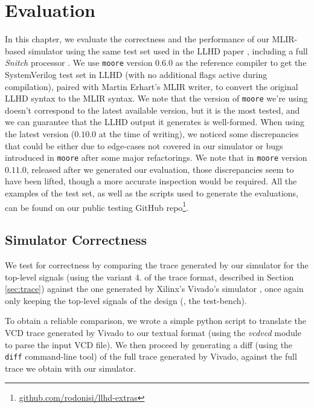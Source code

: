 \chapter{Evaluation}
\label{ch:eval}

In this chapter, we evaluate the correctness and the performance of our MLIR-based simulator using the same test set used in the LLHD paper \cite{Schuiki2020}, including a full \textit{Snitch} processor \cite{Zaruba2020}. We use \texttt{moore} version $0.6.0$ as the reference compiler to get the SystemVerilog test set in LLHD (with no additional flags active during compilation), paired with Martin Erhart's MLIR writer, to convert the original LLHD syntax to the MLIR syntax. We note that the version of \texttt{moore} we're using doesn't correspond to the latest available version, but it is the most tested, and we can guarantee that the LLHD output it generates is well-formed. When using the latest version ($0.10.0$ at the time of writing), we noticed some discrepancies that could be either due to edge-cases not covered in our simulator or bugs introduced in \texttt{moore} after some major refactorings. We note that in \texttt{moore} version $0.11.0$, released after we generated our evaluation, those discrepancies seem to have been lifted, though a more accurate inspection would be required. All the examples of the test set, as well as the scripts used to generate the evaluations, can be found on our public testing GitHub repo\footnote{\url{github.com/rodonisi/llhd-extras}}.


\section{Simulator Correctness}
\label{sec:correctness}
We test for correctness by comparing the trace generated by our simulator for the top-level signals (using the variant 4. of the trace format, described in Section \ref{sec:trace}) against the one generated by Xilinx's Vivado's simulator \cite{vivado}, once again only keeping the top-level signals of the design (\ie, the test-bench).

To obtain a reliable comparison, we wrote a simple python script to translate the VCD trace generated by Vivado to our textual format (using the \textit{vcdvcd} \cite{vcdvcd} module to parse the input VCD file). We then proceed by generating a diff (using the \texttt{diff} command-line tool) of the full trace generated by Vivado, against the full trace we obtain with our simulator.

